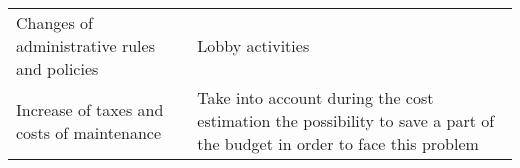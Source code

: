 \begin{longtable}{l|l}
\begin{minipage}[t]{0.45\textwidth}
\end{minipage} \\ \hline
\begin{minipage}[t]{0.5\textwidth}
Changes of administrative rules and policies
\end{minipage} &
\begin{minipage}[t]{0.45\textwidth}
Lobby activities
\end{minipage} \\ \hline
\begin{minipage}[t]{0.5\textwidth}
Increase of taxes and costs of maintenance
\end{minipage} &
\begin{minipage}[t]{0.45\textwidth}
Take into account during the cost estimation the possibility to save a part of the budget in order to face this problem
\end{minipage} \\ \hline
\end{longtable}



